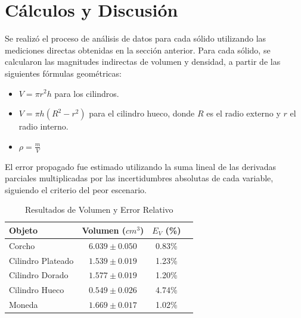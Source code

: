 \clearpage

\section{Cálculos y Discusión}

Se realizó el proceso de análisis de datos para cada sólido
utilizando las mediciones directas obtenidas en la sección anterior.
 Para cada sólido, se calcularon las magnitudes indirectas de volumen y densidad,
 a partir de las siguientes fórmulas geométricas:
\begin{itemize}
    \item $V = \pi r^{2} h$ para los cilindros.
    \item  $V = \pi h (R^{2} - r^{2})$ para el cilindro hueco, donde $R$ es el radio externo y $r$ el radio interno.
    \item $\rho = \frac{m}{V}$
\end{itemize}

El error  propagado fue estimado  utilizando la suma lineal de las derivadas parciales 
multiplicadas por las incertidumbres absolutas de cada variable, 
siguiendo el criterio del peor escenario.

\begin{table}[h!]
\centering
\caption{Resultados de Volumen y Error Relativo}
\label{tab:masa_vol}
    \begin{tabular}{lccc}
    \toprule
    Objeto & Volumen ($cm^3$) & $E_V$ (\%) \\
    \midrule
    Corcho & $6.039 \pm 0.050$ & 0.83\% \\
    Cilindro Plateado & $1.539 \pm 0.019$ & 1.23\% \\
    Cilindro Dorado & $1.577 \pm 0.019$ & 1.20\% \\
    Cilindro Hueco & $0.549 \pm 0.026$ & 4.74\% \\
    Moneda & $1.669 \pm 0.017$ & 1.02\% \\
    \bottomrule
    \end{tabular}
\end{table}

\vspace{0.5cm} %

